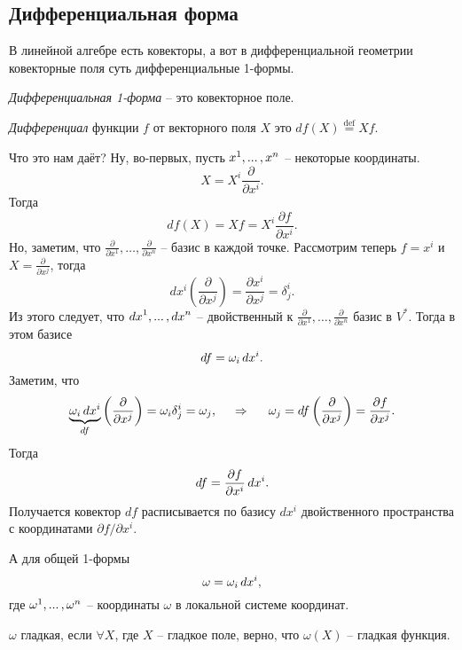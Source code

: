 \subsection{Дифференциальная форма}

В линейной алгебре есть ковекторы, а вот в дифференциальной геометрии ковекторные поля суть дифференциальные 1-формы.

\begin{to_def} 
    \textit{Дифференциальная 1-форма} -- это  ковекторное поле.
\end{to_def}

\begin{to_def} 
    \textit{Дифференциал} функции $f$ от векторного поля $X$ это
    $
        d f (X) \overset{\mathrm{def}}{=}  X f.
    $
\end{to_def}

Что это нам даёт? Ну, во-первых, пусть ${x}^{1}, ... \,, {x}^{n}$ -- некоторые координаты. 
$$
    X = X^i \frac{\partial }{\partial x^i}.
$$
Тогда
$$
    df(X) = Xf = X^i \frac{\partial f}{\partial x^i}.
$$
Но, заметим, что $\frac{\partial }{\partial x^1}, \ldots, \frac{\partial }{\partial x^n}$ -- базис в каждой точке. Рассмотрим теперь $f = x^i$ и $X = \frac{\partial }{\partial x^j} $, тогда
\begin{equation}
    d x^i \left(\frac{\partial }{\partial x^j} \right)
    =
    \frac{\partial x^i}{\partial x^j} = \delta^i_j.
\end{equation}
Из этого следует, что ${dx}^{1}, ... \,, {dx}^{n}$ -- двойственный к $\frac{\partial }{\partial x^1}, \ldots, \frac{\partial }{\partial x^n}$ базис в $V^*$.
Тогда в этом базисе
$$
    d f = \omega_i \, d x^i.
$$
Заметим, что
$$
\underbrace{\omega_i \, d x^i }_{df}
    \left(
        \frac{\partial }{\partial x^j} 
    \right) = \omega_i \delta^i_j = \omega_j,
    \hspace{0.5cm} \Rightarrow \hspace{0.5cm} 
    \omega_j = df \left(\frac{\partial }{\partial x^j} \right) =
    \frac{\partial f}{\partial x^j}.
$$
Тогда
\begin{equation}
    df = \frac{\partial f}{\partial x^i} \, d x^i.
\end{equation}
Получается ковектор $df$ расписывается по базису
$dx^i$
 двойственного пространства с координатами $\partial f / \partial x^i$.

А для общей 1-формы
$$
    \omega = \omega_i \, d x^i,
$$
где ${\omega}^{1}, ... \,, {\omega}^{n}$ -- координаты $\omega$ в локальной системе координат.

\begin{to_def} 
    $\omega$  гладкая, если $\forall X$, где $X$ -- гладкое поле, верно, что
    $\omega(X)$ -- гладкая функция.
\end{to_def}

